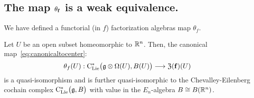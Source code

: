 \documentclass[11pt]{amsart}
\numberwithin{equation}{section}
\begin{document}
\subsection{The map $\theta_{\bf{f}}$ is a weak equivalence.} 

We have defined a functorial (in $f$) factorization algebras map 
$\theta_f$. 


\begin{lmm}\label{L:thetaquisondisk}Let $U$ be an open subset homeomorphic to $\mathbb R^n$. 
 Then, the canonical map~\eqref{eq:canonicaltocenter}:
 \[\theta_f(U): {\rm C}_{\rm Lie}^*\big(\mathfrak g\otimes \Omega (U), B(U) \big) \longrightarrow 
 {\frak Z}(\mathbf{f})(U)\] is a quasi-isomorphism and is further quasi-isomorphic 
 to the Chevalley-Eilenberg cochain complex ${\rm C}_{\rm Lie}^* \big(\mathfrak g, B\big)$ 
 with value in the $E_n$-algebra $B\cong B(\mathbb R^n)$.
\end{lmm}
\end{document}
